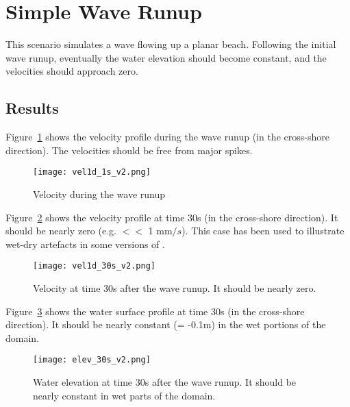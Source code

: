 \section{Simple Wave Runup}
This scenario simulates a wave flowing up a planar beach. Following the initial wave runup, eventually the water elevation should become constant, and the velocities should approach zero. 

\subsection{Results}
Figure~\ref{runupfig1} shows the velocity profile during the wave runup (in the cross-shore direction). The velocities should be free from major spikes.

\begin{figure}[h]
\begin{center}
\texttt{[image: vel1d\_1s\_v2.png]}
\caption{Velocity during the wave runup}
\label{runupfig1}
\end{center}
\end{figure}

Figure~\ref{runupfig2} shows the velocity profile at time 30s (in the cross-shore direction). It should be nearly zero (e.g. $<<$ 1 mm$/s$). This case has been used to illustrate wet-dry artefacts in some versions of \anuga.

\begin{figure}[h]
\begin{center}
\texttt{[image: vel1d\_30s\_v2.png]}
\caption{Velocity at time 30s after the wave runup. It should be nearly zero.}
\label{runupfig2}
\end{center}
\end{figure}

Figure~\ref{runupfig3} shows the water surface profile at time 30s (in the cross-shore direction). It should be nearly constant (= -0.1m) in the wet portions of the domain.
\begin{figure}[h]
\begin{center}
\texttt{[image: elev\_30s\_v2.png]}
\caption{Water elevation at time 30s after the wave runup. It should be nearly constant in wet parts of the domain.}
\label{runupfig3}
\end{center}
\end{figure}

\endinput
